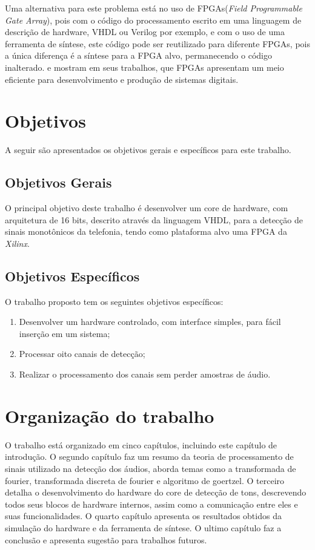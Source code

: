 \documentclass[monografia]{subfiles}
\begin{document}
		Uma alternativa para este problema está no uso de FPGAs(\textit{Field Programmable Gate Array}), pois com o código do processamento escrito em uma
		linguagem de descrição de hardware, VHDL ou Verilog por exemplo, e com o uso de uma ferramenta de síntese, este código pode ser reutilizado
		para diferente FPGAs, pois a única diferença é a síntese para a FPGA alvo, permanecendo o código inalterado. 
		\cite{Kamai} e \cite{Lennart} mostram em seus trabalhos, que FPGAs apresentam um meio eficiente para desenvolvimento e produção de sistemas digitais.


	\section{Objetivos}
		A seguir são apresentados os objetivos gerais e específicos para este trabalho.

	\subsection{Objetivos Gerais}
		O principal objetivo deste trabalho é desenvolver um core de hardware, com arquitetura de 16 bits, descrito através da linguagem VHDL, 
		para a detecção de sinais monotônicos da telefonia, tendo como plataforma alvo uma FPGA da \textit{Xilinx}.



	\subsection{Objetivos Específicos}
		O trabalho proposto tem os seguintes objetivos específicos:

			\begin{enumerate}
			\label{sec:test}
				\item Desenvolver um hardware controlado, com interface simples, para fácil inserção em um sistema;
				\item Processar oito canais de detecção;
				\item Realizar o processamento dos canais sem perder amostras de áudio.

			\end{enumerate}


	\section{Organização do trabalho}
		O trabalho está organizado em cinco capítulos, incluindo este capítulo de introdução. O segundo capítulo faz um resumo da teoria de processamento de sinais
		utilizado na detecção dos áudios, aborda temas  como a transformada de fourier, transformada discreta de fourier e algoritmo de goertzel.
		O terceiro detalha o desenvolvimento do hardware do core de detecção de tons, descrevendo todos seus blocos de
		hardware internos, assim como a comunicação entre eles e suas funcionalidades. 
		O quarto capítulo apresenta os resultados obtidos da simulação do hardware e da ferramenta de síntese. O ultimo capítulo faz a conclusão e 
		apresenta sugestão para trabalhos futuros.
\end{document}
